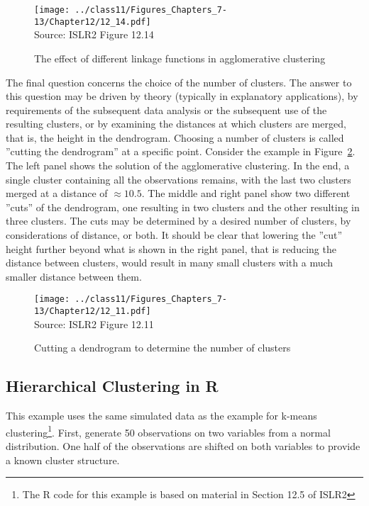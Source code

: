 \begin{figure}
\centering
\texttt{[image: ../class11/Figures\_Chapters\_7-13/Chapter12/12\_14.pdf]} \\

\scriptsize Source: ISLR2 Figure 12.14
\caption{The effect of different linkage functions in agglomerative clustering}
\label{fig:dendro2}
\end{figure}

The final question concerns the choice of the number of clusters. The answer to this question may be driven by theory (typically in explanatory applications), by requirements of the subsequent data analysis or the subsequent use of the resulting clusters, or by examining the distances at which clusters are merged, that is, the height in the dendrogram. Choosing a number of clusters is called ''cutting the dendrogram'' at a specific point. Consider the example in Figure~\ref{fig:dendro3}. The left panel shows the solution of the agglomerative clustering. In the end, a single cluster containing all the observations remains, with the last two clusters merged at a distance of $\approx 10.5$. The middle and right panel show two different ''cuts'' of the dendrogram, one resulting in two clusters and the other resulting in three clusters. The cuts may be determined by a desired number of clusters, by considerations of distance, or both. It should be clear that lowering the ''cut'' height further beyond what is shown in the right panel, that is reducing the distance between clusters, would result in many small clusters with a much smaller distance between them. 

\begin{figure}
\centering
\texttt{[image: ../class11/Figures\_Chapters\_7-13/Chapter12/12\_11.pdf]} \\

\scriptsize Source: ISLR2 Figure 12.11
\caption{Cutting a dendrogram to determine the number of clusters}
\label{fig:dendro3}
\end{figure}


\subsection{Hierarchical Clustering in R}

This example uses the same simulated data as the example for k-means clustering\footnote{The R code for this example is based on material in Section 12.5 of ISLR2}. First, generate 50 observations on two variables from a normal distribution. One half of the observations are shifted on both variables to provide a known cluster structure.

